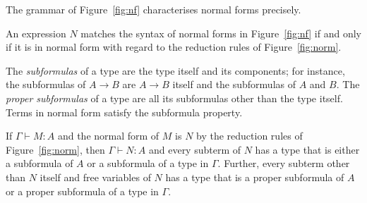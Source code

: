 

The grammar of Figure~\ref{fig:nf} characterises normal forms
precisely.

\begin{proposition}
\label{prop_normal}
An expression $N$ matches the syntax of normal forms in
Figure~\ref{fig:nf} if and only if it is in normal form with regard to
the reduction rules of Figure~\ref{fig:norm}.
\end{proposition}

The \emph{subformulas} of a type are the type itself and its
components; for instance, the subformulas of $A \to B$ are $A \to B$
itself and the subformulas of $A$ and $B$. The \emph{proper
  subformulas} of a type are all its subformulas other than the type
itself.  Terms in normal form satisfy the subformula property.

\begin{proposition}
\label{prop_subformula}
If $\Gamma \vdash M:A$ and the normal form of $M$ is $N$ by the
reduction rules of Figure~\ref{fig:norm}, then $\Gamma \vdash N:A$ and
every subterm of $N$ has a type that is either a subformula of $A$ or
a subformula of a type in $\Gamma$.  Further, every subterm other than
$N$ itself and free variables of $N$ has a type that is a proper
subformula of $A$ or a proper subformula of a type in $\Gamma$.
\end{proposition}




